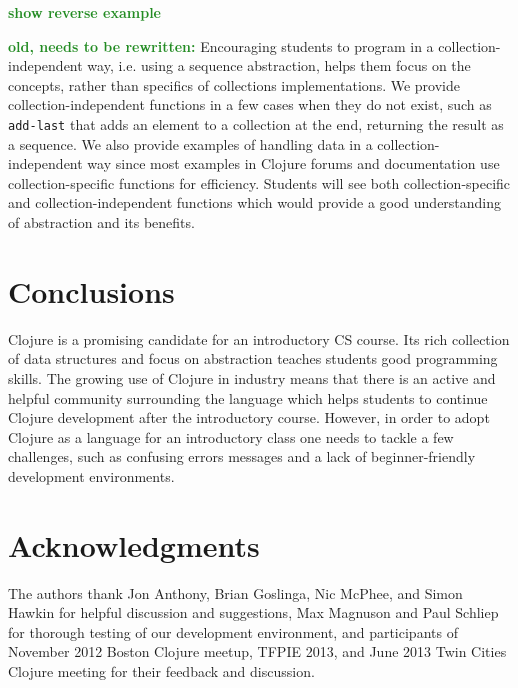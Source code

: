 \documentclass[submission,copyright,creativecommons]{eptcs}
\newcommand{\allcomments}[1]{{#1}}
\newcommand{\elenacomment}[1]{{\bf \textcolor{ForestGreen}{\allcomments{{#1}}}}}
\newcommand{\joecomment}[1]{{\bf \color{JoesGold}{\allcomments{{#1}}}}}
\newcommand{\todo}[1]{{\bf \color{magenta}{\allcomments{ To-do: {#1}}}}}
\begin{document}
\elenacomment{show reverse example}


\elenacomment{old, needs to be rewritten:}
Encouraging students to program in a collection-independent way, i.e. using a sequence abstraction, helps them focus on the concepts, rather than specifics of collections implementations. We provide collection-independent functions in a few cases when they do not exist, such as {\tt add-last} that adds an element to a collection at the end, returning the result as a sequence. We also provide examples of handling data in a collection-independent way since most  examples in Clojure forums and documentation use collection-specific functions for efficiency. Students will see both collection-specific and collection-independent functions which would provide a good understanding of abstraction and its benefits. 



\section{Conclusions}
Clojure is a promising candidate for an introductory CS course. Its rich collection of data structures and focus on abstraction teaches students good programming skills. The growing use of Clojure in industry means that there is an active and helpful community surrounding the language which helps students to continue Clojure development after the introductory course. However, in order to adopt Clojure as a language for an introductory class one needs to tackle a few challenges, such as confusing errors messages and  a lack of beginner-friendly development environments.

\section{Acknowledgments}
The authors thank Jon Anthony, Brian Goslinga, Nic McPhee, and Simon Hawkin for helpful discussion and suggestions, %
Max Magnuson and Paul Schliep for thorough testing of our development environment, and participants of November 2012 Boston Clojure meetup, TFPIE 2013, and June 2013 Twin Cities Clojure meeting for their feedback and discussion. 




\end{document}
